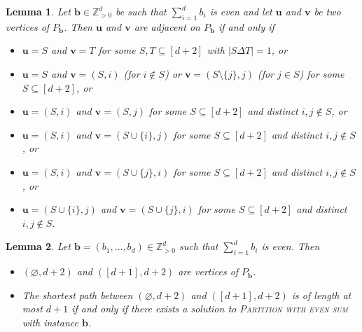 \documentclass[10pt,a4paper]{amsart}
\newtheorem{lem}{Lemma}
\renewcommand{\emptyset}{\varnothing}
\begin{document}
\begin{lem}
\label{lem:edgetypes}
Let $\mathbf{b}\in \mathbb{Z}_{>0}^d$ be such that $\sum_{i=1}^d b_i$ is even and let $\mathbf{u}$ and $\mathbf{v}$ be two vertices of $P_{\mathbf{b}}$. Then $\mathbf{u}$ and $\mathbf{v}$ are adjacent on $P_\mathbf{b}$ if and only if 
\begin{itemize}
    \item[(a)] $\mathbf{u} = S$ and $\mathbf{v} = T$ for some $S, T\subseteq [d+2]$ with $|S\Delta T|=1$, or
    \item[(b)]  $\mathbf{u} = S$ and $\mathbf{v} = (S,i)$ (for $i\notin S$) or $\mathbf{v} = (S\setminus \{j\}, j)$ (for $j\in S$) for some $S\subseteq [d+2]$, or
    \item[(c)] $\mathbf{u} = (S,i)$ and $\mathbf{v} = (S,j)$ for some $S\subseteq [d+2]$ and distinct $i,j\notin S$, or
    \item[(d)] $\mathbf{u} = (S,i)$ and $\mathbf{v} = (S \cup \{i\}, j)$ for some $S\subseteq [d+2]$ and distinct $i,j\notin S$, or
    \item[(e)] $\mathbf{u} = (S,i)$ and $\mathbf{v} = (S \cup \{j\}, i)$ for some $S\subseteq [d+2]$ and distinct $i,j\notin S$, or
    \item[(f)] $\mathbf{u} = (S \cup \{i\},j)$ and $\mathbf{v} = (S \cup \{j\}, i)$ for some $S\subseteq [d+2]$ and distinct $i,j\notin S$.
\end{itemize}
\end{lem}

\begin{lem}
\label{lem:partitionreduction}
Let $\mathbf{b}=(b_1,\ldots,b_d)\in \mathbb{Z}_ {>0}^d$ such that $\sum_{i=1}^{d}{b_i}$ is even. Then
\begin{itemize}
    \item $(\emptyset,d+2)$ and $([d+1],d+2)$ are vertices of $P_{\mathbf{b}}$. 
    \item The shortest path between $(\emptyset,d+2)$ and $([d+1],d+2)$ is of length at most $d+1$ if and only if there exists a solution to \textsc{Partition  with even sum} with instance $\mathbf{b}$.
\end{itemize}

\end{lem}
\end{document}
